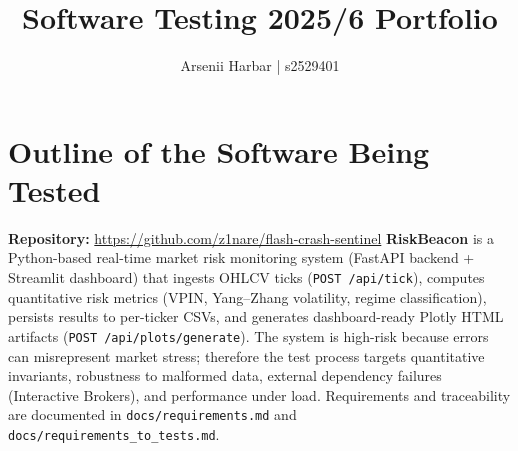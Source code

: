 \documentclass[11pt]{article}
\title{Software Testing 2025/6 Portfolio}
\author{Arsenii Harbar | s2529401 }
\begin{document}
\maketitle


\section{Outline of the Software Being Tested}

\textbf{Repository:} \url{https://github.com/z1nare/flash-crash-sentinel} \newline
\textbf{RiskBeacon} is a Python-based real-time market risk monitoring system (FastAPI backend + Streamlit dashboard) that ingests OHLCV ticks (\texttt{POST /api/tick}), computes quantitative risk metrics (VPIN, Yang--Zhang volatility, regime classification), persists results to per-ticker CSVs, and generates dashboard-ready Plotly HTML artifacts (\texttt{POST /api/plots/generate}). The system is high-risk because errors can misrepresent market stress; therefore the test process targets quantitative invariants, robustness to malformed data, external dependency failures (Interactive Brokers), and performance under load. Requirements and traceability are documented in \texttt{docs/requirements.md} and \texttt{docs/requirements\_to\_tests.md}.
\end{document}
